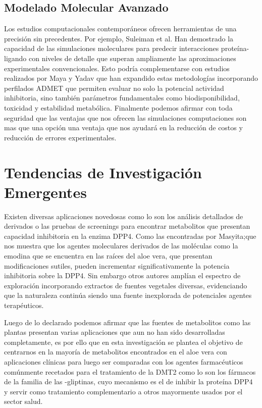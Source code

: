  \subsection{Modelado Molecular Avanzado}
 
 Los estudios computacionales contemporáneos ofrecen herramientas de una precisión sin precedentes. Por ejemplo, Suleiman et al. Han demostrado la capacidad de las simulaciones moleculares para predecir interacciones proteína-ligando con niveles de detalle que superan ampliamente las aproximaciones experimentales convencionales. %
 Esto podría complementarse con estudios realizados por Maya y Yadav que han expandido estas metodologías incorporando perfilados ADMET que permiten evaluar no solo la potencial actividad inhibitoria, sino también parámetros fundamentales como biodisponibilidad, toxicidad y estabilidad metabólica.%
 Finalmente podemos afirmar con toda seguridad que las ventajas que nos ofrecen las simulaciones computaciones son mas que una opción una ventaja que nos ayudará en la reducción de costos y reducción de errores experimentales.

 \section{Tendencias de Investigación Emergentes}
 Existen diversas aplicaciones novedosas como lo son los análisis detallados de derivados o las pruebas de screenings para encontrar metabolitos que presentan capacidad inhibitoria en la enzima DPP4. Como las encontradas por Masyita;que nos muestra que los agentes moleculares derivados de las moléculas como la emodina que se encuentra en las raíces del aloe vera, que presentan modificaciones sutiles, pueden incrementar significativamente la potencia inhibitoria sobre la DPP4. %
 Sin embargo otros autores amplían el espectro de exploración incorporando extractos de fuentes vegetales diversas, evidenciando que la naturaleza continúa siendo una fuente inexplorada de potenciales agentes terapéuticos.%

 Luego de lo declarado podemos afirmar que las fuentes de metabolitos como las plantas presentan varias aplicaciones que aun no han sido desarrolladas completamente, es por ello que en esta investigación se plantea el objetivo de centrarnos en la mayoría de metabolitos encontrados en el aloe vera con aplicaciones clínicas para luego ser comparadas con los agentes farmacéuticos comúnmente recetados para el tratamiento de la DMT2 como lo son los fármacos de la familia de las -gliptinas, cuyo mecanismo es el de inhibir la proteína DPP4 y servir como tratamiento complementario a otros mayormente usados por el sector salud.   

